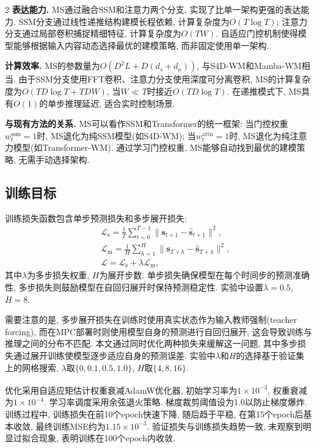 \begin{multicols}{2}
\textbf{表达能力.}
MS通过融合SSM和注意力两个分支, 实现了比单一架构更强的表达能力.
SSM分支通过线性递推结构建模长程依赖, 计算复杂度为$O(T\log T)$;
注意力分支通过局部卷积捕捉精细特征, 计算复杂度为$O(TW)$.
自适应门控机制使得模型能够根据输入内容动态选择最优的建模策略,
而非固定使用单一架构.

\textbf{计算效率.}
MS的参数量为$O(D^2L + D(d_s+d_a))$, 与S4D-WM和Mamba-WM相当.
由于SSM分支使用FFT卷积、注意力分支使用深度可分离卷积,
MS的计算复杂度为$O(TD\log T + TDW)$, 当$W \ll T$时接近$O(TD\log T)$.
在递推模式下, MS具有$O(1)$的单步推理延迟, 适合实时控制场景.

\textbf{与现有方法的关系.}
MS可以看作SSM和Transformer的统一框架:
当门控权重$w_t^{\text{ssm}} = 1$时, MS退化为纯SSM模型(如S4D-WM);
当$w_t^{\text{attn}} = 1$时, MS退化为纯注意力模型(如Transformer-WM).
通过学习门控权重, MS能够自动找到最优的建模策略, 无需手动选择架构.

\subsection{训练目标}

训练损失函数包含单步预测损失和多步展开损失:
\begin{eqnarray}
&&\mathcal{L}_{\text{s}} = \frac{1}{T}\sum_{t=0}^{T-1}\|{\bm s}_{t+1} - \hat{{\bm s}}_{t+1}\|^2, \\
&&\mathcal{L}_{\text{m}} = \frac{1}{H}\sum_{h=1}^{H}\|{\bm s}_{T+h} - \hat{{\bm s}}_{T+h}\|^2, \\
&&\mathcal{L} = \mathcal{L}_{\text{s}} + \lambda \mathcal{L}_{\text{m}},
\end{eqnarray}
其中$\lambda$为多步损失权重, $H$为展开步数.
单步损失确保模型在每个时间步的预测准确性,
多步损失则鼓励模型在自回归展开时保持预测稳定性.
实验中设置$\lambda=0.5$, $H=8$.

需要注意的是, 多步展开损失在训练时使用真实状态作为输入教师强制(teacher forcing),
而在MPC部署时则使用模型自身的预测进行自回归展开,
这会导致训练与推理之间的分布不匹配.
本文通过同时优化两种损失来缓解这一问题,
其中多步损失通过展开训练使模型逐步适应自身的预测误差.
实验中$\lambda$和$H$的选择基于验证集上的网格搜索, $\lambda$取$\{0, 0.1, 0.5, 1.0\}$, $H$取$\{4, 8, 16\}$.

优化采用自适应矩估计权重衰减AdamW优化器\textsuperscript{\cite{27}}, 初始学习率为$1\times10^{-3}$,
权重衰减为$1\times10^{-4}$.
学习率调度采用余弦退火策略.
梯度裁剪阈值设为1.0以防止梯度爆炸.
训练过程中, 训练损失在前10个epoch快速下降, 随后趋于平稳,
在第15个epoch后基本收敛, 最终训练MSE约为$1.15\times10^{-3}$.
验证损失与训练损失趋势一致, 未观察到明显过拟合现象,
表明训练在100个epoch内收敛.


\end{multicols}
